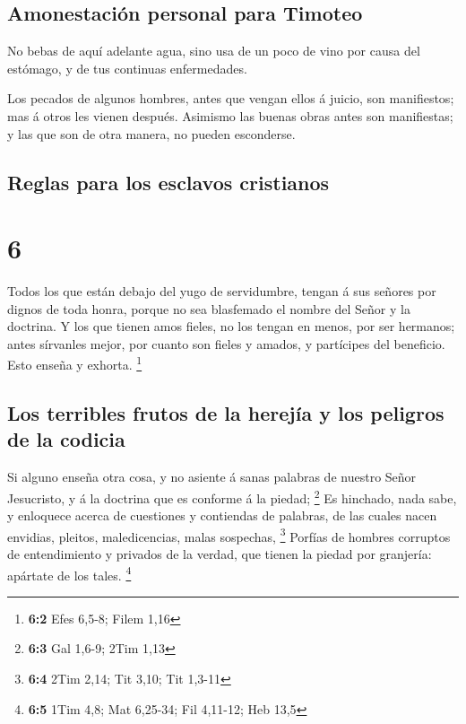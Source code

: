 \hypertarget{amonestaciuxf3n-personal-para-timoteo}{%
\subsection{Amonestación personal para
Timoteo}\label{amonestaciuxf3n-personal-para-timoteo}}

 No bebas de aquí adelante agua, sino usa de un poco de
vino por causa del estómago, y de tus continuas enfermedades.

 Los pecados de algunos hombres, antes que vengan ellos á
juicio, son manifiestos; mas á otros les vienen después. 
Asimismo las buenas obras antes son manifiestas; y las que son de otra
manera, no pueden esconderse.

\hypertarget{reglas-para-los-esclavos-cristianos}{%
\subsection{Reglas para los esclavos
cristianos}\label{reglas-para-los-esclavos-cristianos}}

\hypertarget{section-5}{%
\section{6}\label{section-5}}

 Todos los que están debajo del yugo de servidumbre,
tengan á sus señores por dignos de toda honra, porque no sea blasfemado
el nombre del Señor y la doctrina.  Y los que tienen amos
fieles, no los tengan en menos, por ser hermanos; antes sírvanles mejor,
por cuanto son fieles y amados, y partícipes del beneficio. Esto enseña
y exhorta. \footnote{\textbf{6:2} Efes 6,5-8; Filem 1,16}

\hypertarget{los-terribles-frutos-de-la-herejuxeda-y-los-peligros-de-la-codicia}{%
\subsection{Los terribles frutos de la herejía y los peligros de la
codicia}\label{los-terribles-frutos-de-la-herejuxeda-y-los-peligros-de-la-codicia}}

 Si alguno enseña otra cosa, y no asiente á sanas palabras
de nuestro Señor Jesucristo, y á la doctrina que es conforme á la
piedad; \footnote{\textbf{6:3} Gal 1,6-9; 2Tim 1,13}  Es
hinchado, nada sabe, y enloquece acerca de cuestiones y contiendas de
palabras, de las cuales nacen envidias, pleitos, maledicencias, malas
sospechas, \footnote{\textbf{6:4} 2Tim 2,14; Tit 3,10; Tit 1,3-11}
 Porfías de hombres corruptos de entendimiento y privados
de la verdad, que tienen la piedad por granjería: apártate de los tales.
\footnote{\textbf{6:5} 1Tim 4,8; Mat 6,25-34; Fil 4,11-12; Heb 13,5}

